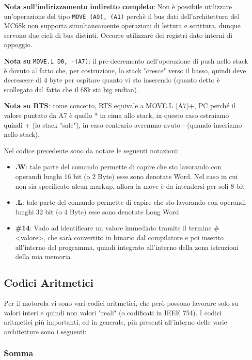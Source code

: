 \textbf{Nota sull'indirizzamento indiretto completo}: Non è possibile utilizzare un'operazione del tipo \lstinline|MOVE (A0), (A1)| perchè il bus dati dell'architettura del MC68k non supporta simultaneamente operazioni di lettura e scrittura, dunque servono due cicli di bus distinti. Occorre utilizzare dei registri dato interni di appoggio.

\textbf{Nota su} \lstinline|MOVE.L D0, -(A7)|: il pre-decremento nell'operazione di push nello stack è dovuto al fatto che, per costruzione, lo stack "cresce" verso il basso, quindi deve decrescere di 4 byte per ospitare quanto vi sto inserendo (quanto detto è scollegato dal fatto che il 68k sia big endian).

\textbf{Nota su RTS}: come concetto, RTS equivale a MOVE.L (A7)+, PC perché il valore puntato da A7 è quello * in cima allo stack, in questo caso estraiamo quindi + (lo stack "sale"), in caso contrario avremmo avuto - (quando inseriamo nello stack).

Nel codice precedente sono da notare le seguenti notazioni:
\begin{itemize}
    \item \textbf{.W}: tale parte del comando permette di capire che sto lavorando con operandi lunghi 16 bit (o 2 Byte) esse sono denotate Word. Nel caso in cui non sia specificato alcun markup, allora la move è da intendersi per soli 8 bit
    \item \textbf{.L}: tale parte del comando permette di capire che sto lavorando con operandi lunghi 32 bit (o 4 Byte) esse sono denotate Long Word
    \item \textbf{\#14}: Vado ad identificare un valore immediato tramite il termine \#<valore>, che sarà convertito in binario dal compilatore e poi inserito all'interno del programma, quindi integrato all'interno della zona istruzioni della mia memoria
\end{itemize}

\newpage

\subsection{Codici Aritmetici}
Per il motorola vi sono vari codici aritmetici, che però possono lavorare solo su valori interi e quindi non valori "reali" (o codificati in IEEE 754).
I codici aritmetici più importanti, ed in generale, più presenti all'interno delle varie architetture sono i seguenti:

\subsubsection{Somma}

